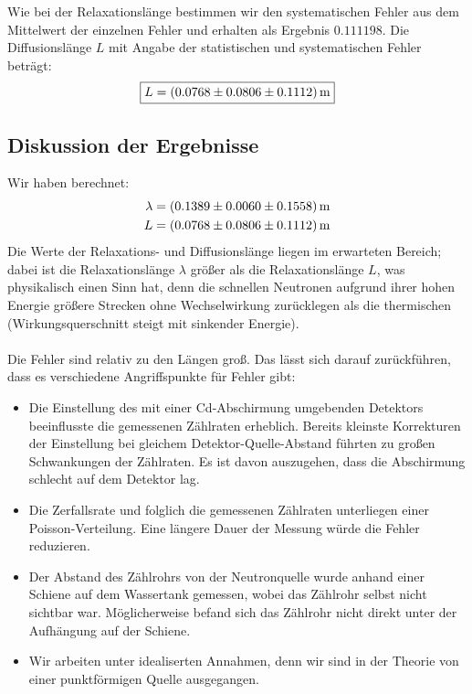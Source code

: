 \documentclass[a4paper,titlepage]{scrartcl}
\numberwithin{equation}{section}
\begin{document}
Wie bei der Relaxationslänge bestimmen wir den systematischen Fehler aus dem Mittelwert der einzelnen Fehler und erhalten als Ergebnis $0.111198$. Die Diffusionslänge $L$ mit Angabe der statistischen und systematischen Fehler beträgt:
\begin{equation*}
\boxed{L=\unit[(0.0768 \pm 0.0806 \pm 0.1112)]{m}}
\end{equation*}
\subsection{Diskussion der Ergebnisse}
\label{subsec:conclusion}
Wir haben berechnet:
\begin{align*}
\lambda&=\unit[(0.1389 \pm 0.0060 \pm 0.1558)]{m}\\
L&=\unit[(0.0768 \pm 0.0806 \pm 0.1112)]{m}
\end{align*}
Die Werte der Relaxations- und Diffusionslänge liegen im erwarteten Bereich; dabei ist die Relaxationslänge $\lambda$ größer als die Relaxationslänge $L$, was physikalisch einen Sinn hat, denn die schnellen Neutronen aufgrund ihrer hohen Energie größere Strecken ohne Wechselwirkung zurücklegen als die thermischen (Wirkungsquerschnitt steigt mit sinkender Energie).\\ \\
Die Fehler sind relativ zu den Längen groß. Das lässt sich darauf zurückführen, dass es verschiedene Angriffspunkte für Fehler gibt:
\begin{itemize}
\item Die Einstellung des mit einer Cd-Abschirmung umgebenden Detektors beeinflusste die gemessenen Zählraten erheblich. Bereits kleinste Korrekturen der Einstellung bei gleichem Detektor-Quelle-Abstand führten zu großen Schwankungen der Zählraten. Es ist davon auszugehen, dass die Abschirmung schlecht auf dem Detektor lag.
\item Die Zerfallsrate und folglich die gemessenen Zählraten unterliegen einer Poisson-Verteilung. Eine längere Dauer der Messung würde die Fehler reduzieren.
\item Der Abstand des Zählrohrs von der Neutronquelle wurde anhand einer Schiene auf dem Wassertank gemessen, wobei das Zählrohr selbst nicht sichtbar war. Möglicherweise befand sich das Zählrohr nicht direkt unter der Aufhängung auf der Schiene.
\item Wir arbeiten unter idealiserten Annahmen, denn wir sind in der Theorie von einer punktförmigen Quelle ausgegangen.
\end{itemize}
\end{document}
